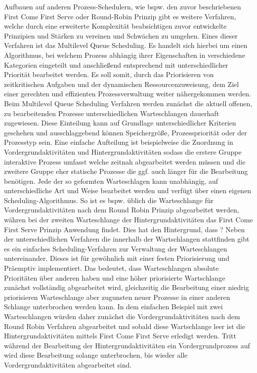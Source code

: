 Aufbauen auf anderen Prozess-Schedulern, wie bspw. den zuvor beschriebenen First Come First Serve oder Round-Robin Prinzip gibt es weitere Verfahren, welche durch eine erweiterte Komplexität beabsichtigen zuvor entwickelte Prinzipien und Stärken zu vereinen und Schwächen zu umgehen. Eines dieser Verfahren ist das Multilevel Queue Scheduling. Es handelt sich hierbei um einen Algorithmus, bei welchem Prozess abhängig ihrer Eigenschaften in verschiedene Kategorien eingeteilt und anschließend entsprechend mit unterschiedlicher Priorität bearbeitet werden. Es soll somit, durch das Priorisieren von zeitkritischen Aufgaben und der dynamischen Ressourcenzuweisung, dem Ziel einer gerechten und effizienten Prozessverwaltung weiter nähergekommen werden.
Beim Multilevel Queue Scheduling Verfahren werden zunächst die aktuell offenen, zu bearbeitenden Prozesse unterschiedlichen Warteschlangen dauerhaft zugewiesen. Diese Einteilung kann auf Grundlage unterschiedlicher Kriterien geschehen und ausschlaggebend können Speichergröße, Prozesspriorität oder der Prozesstyp sein. Eine einfache Aufteilung ist beispielweise die Zuordnung in Vordergrundaktivitäten und Hintergrundaktivitäten sodass die erstere Gruppe interaktive Prozess umfasst welche zeitnah abgearbeitet werden müssen und die zweitere Gruppe eher statische Prozesse die ggf. auch länger für die Bearbeitung benötigen. Jede der so geformten Warteschlagen kann unabhängig, auf unterschiedliche Art und Weise bearbeitet werden und verfügt über einen eigenen Scheduling-Algorithmus. So ist es bspw. üblich die Warteschlange für Vordergrundaktivitäten nach dem Round Robin Prinzip abgearbeitet werden, währen bei der zweiten Warteschlange der Hintergrundaktivitäten das First Come First Serve Prinzip Anwendung findet. Dies hat den Hintergrund, dass ? %
Neben der unterschiedlichen Verfahren die innerhalb der Wartschlangen stattfinden gibt es ein einfaches Scheduling-Verfahren zur Verwaltung der Warteschlangen untereinander. Dieses ist für gewöhnlich mit einer festen Priorisierung und Präemptiv implementiert. Das bedeutet, dass Warteschlangen absolute Prioritäten über anderen haben und eine höher priorisierte Wartschlange zunächst vollständig abgearbeitet wird, gleichzeitig die Bearbeitung einer niedrig priorisieren Warteschlange aber zugunsten neuer Prozesse in einer anderen Schlange unterbrochen werden kann. 
In dem einfachen Beispiel mit zwei Warteschlangen würden daher zunächst die Vordergrundaktivitäten nach dem Round Robin Verfahren abgearbeitet und sobald diese Wartschlange leer ist die Hintergrundaktivitäten mittels First Come First Serve erledigt werden. Tritt während der Bearbeitung der Hintergrundaktivitäten ein Vordergrundprozess auf wird diese Bearbeitung solange unterbrochen, bis wieder alle Vordergrundaktivitäten abgearbeitet sind.
